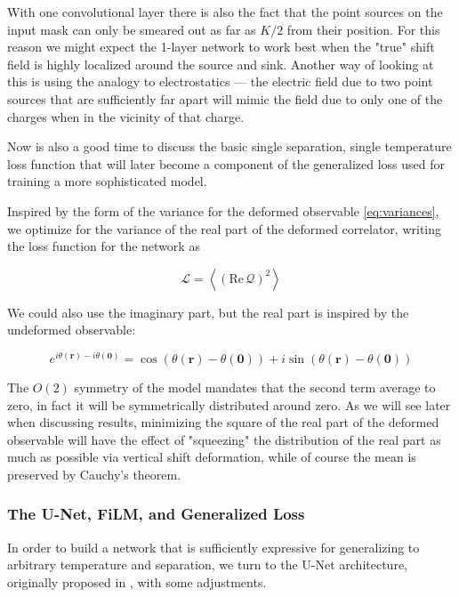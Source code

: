 \documentclass[12pt]{article}
\begin{document}
With one convolutional layer there is also the fact that the point sources on the input mask can only be smeared out as far as $K/2$ from their position.
For this reason we might expect the 1-layer network to work best when the "true" shift field is highly localized around the source and sink. Another way
of looking at this is using the analogy to electrostatics --- the electric field due to two point sources that are sufficiently far apart will mimic
the field due to only one of the charges when in the vicinity of that charge. 

Now is also a good time to discuss the basic single separation, single temperature loss function that will later become a component of the
generalized loss used for training a more sophisticated model. 

Inspired by the form of the variance for the deformed observable \ref{eq:variances}, we optimize for the variance of the real part of the 
deformed correlator, writing the loss function for the network as 

\begin{equation} \label{eq:loss}
	\mathcal{L} = \left\langle \left( \mathrm{Re}\, \mathcal{Q} \right)^2 \right\rangle
\end{equation}

We could also use the imaginary part, but the real part is inspired by the undeformed observable:

\begin{equation*}
	e^{i\theta(\mathbf{r})-i\theta(\mathbf{0})} = \cos\left(\theta(\mathbf{r}) - \theta(\mathbf{0})\right) + i\sin\left(\theta(\mathbf{r}) - \theta(\mathbf{0})\right)
\end{equation*}

The $O(2)$ symmetry of the model mandates that the second term average to zero, in fact it will be symmetrically distributed around zero.
As we will see later when discussing results, minimizing the square of the real part of the deformed observable will have the effect of "squeezing" the distribution of the real part
as much as possible via vertical shift deformation, while of course the mean is preserved by Cauchy's theorem.

\subsubsection{The U-Net, FiLM, and Generalized Loss}

In order to build a network that is sufficiently expressive for generalizing to arbitrary temperature and separation, we turn to the 
U-Net architecture, originally proposed in \cite{ronneberger2015unetconvolutionalnetworksbiomedical}, with some adjustments.
\end{document}
